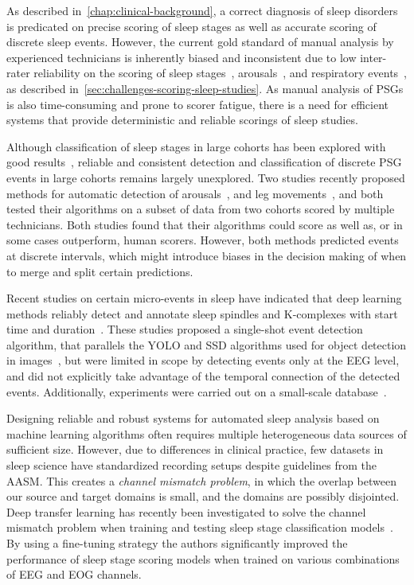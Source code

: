 As described in~\cref{chap:clinical-background}, a correct diagnosis of sleep disorders is predicated on precise scoring of sleep stages as well as accurate scoring of discrete sleep events. 
However, the current gold standard of manual analysis by experienced technicians is inherently biased and inconsistent due to low inter-rater reliability on the scoring of sleep stages~\cite{Norman2000,Rosenberg2013,Younes2016}, arousals~\cite{Bonnet2007}, and respiratory events~\cite{Rosenberg2014}, as described in~\cref{sec:challenges-scoring-sleep-studies}. 
As manual analysis of \acsp{PSG} is also time-consuming and prone to scorer fatigue, there is a need for efficient systems that provide deterministic and reliable scorings of sleep studies.

Although classification of sleep stages in large cohorts has been explored with good results~\cite{Olesen2018,Stephansen2018,Chambon2018c, Biswal2018, Phan2018}, reliable and consistent detection and classification of discrete \ac{PSG} events in large cohorts remains largely unexplored. 
Two studies recently proposed methods for automatic detection of arousals~\cite{Brink-Kjaer2020}, and leg movements~\cite{Carvelli2020}, and both tested their algorithms on a subset of data from two cohorts scored by multiple technicians. 
Both studies found that their algorithms could score as well as, or in some cases outperform, human scorers. 
However, both methods predicted events at discrete intervals, which might introduce biases in the decision making of when to merge and split certain predictions.

Recent studies on certain micro-events in sleep have indicated that deep learning methods reliably detect and annotate sleep spindles and K-complexes with start time and duration~\cite{Chambon2018b,Chambon2019}. 
These studies proposed a single-shot event detection algorithm, that parallels the YOLO and SSD algorithms used for object detection in \twod images~\cite{Redmon2016a,Redmon2016b,Liu2016}, but were limited in scope by detecting events only at the \ac{EEG} level, and did not explicitly take advantage of the temporal connection of the detected events. 
Additionally, experiments were carried out on a small-scale database~\cite{Chambon2018b}. 

Designing reliable and robust systems for automated sleep analysis based on machine learning algorithms often requires multiple heterogeneous data sources of sufficient size.
However, due to differences in clinical practice, few datasets in sleep science have standardized recording setups despite guidelines from the \ac{AASM}.
This creates a \textit{channel mismatch problem}, in which the overlap between our source and target domains is small, and the domains are possibly disjointed. 
Deep transfer learning has recently been investigated to solve the channel mismatch problem when training and testing sleep stage classification models~\cite{Phan2019, Phan2019c}.
By using a fine-tuning strategy the authors significantly improved the performance of sleep stage scoring models when trained on various combinations of \ac{EEG} and \ac{EOG} channels.

